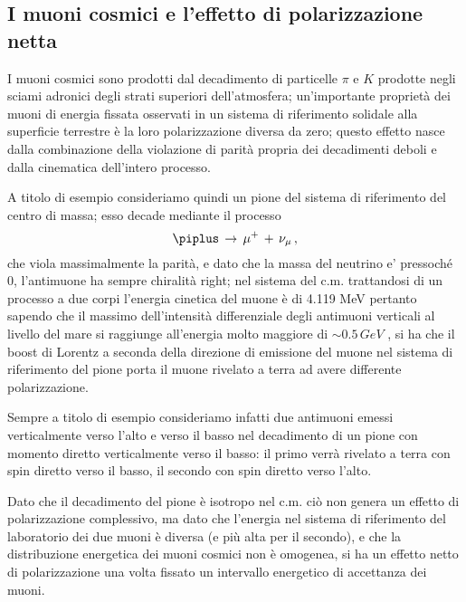 \subsection{I muoni cosmici e l'effetto di polarizzazione netta}
I muoni cosmici sono prodotti dal decadimento di particelle $\pi$ e $K$ prodotte negli sciami adronici degli strati superiori dell'atmosfera; un'importante proprietà dei muoni di energia fissata osservati in un sistema di riferimento solidale alla superficie terrestre è la loro polarizzazione diversa da zero; questo effetto nasce dalla combinazione della violazione di parità propria dei decadimenti deboli e dalla cinematica dell'intero processo. \par
A titolo di esempio consideriamo quindi un pione del sistema di riferimento del centro di massa; esso decade mediante il processo
\begin{equation}
	\piplus \, \to \, \mu^+ \, + \, \nu_{\mu} \, ,
	\label{eq:pi_decay}
\end{equation}
che viola massimalmente la parità, e dato che la massa del neutrino e' pressoch\'e 0, l'antimuone ha sempre chiralità right; nel sistema del c.m. trattandosi di un processo a due corpi l'energia cinetica del muone è di 4.119 MeV  pertanto sapendo che il massimo dell'intensità differenziale degli antimuoni verticali al livello del mare si raggiunge all'energia molto maggiore di $\sim 0.5 \, GeV$  \cite{bib:AJP-Amsler}, si ha che il boost di Lorentz a seconda della direzione di emissione del muone nel sistema di riferimento del pione porta il muone rivelato a terra ad avere differente polarizzazione. \par
Sempre a titolo di esempio consideriamo infatti due antimuoni emessi verticalmente verso l'alto e verso il basso nel decadimento di un pione con momento diretto verticalmente verso il basso:
il primo verrà rivelato a terra con spin diretto verso il basso, il secondo con spin diretto verso l'alto. \par
Dato che il decadimento del pione è isotropo nel c.m. ciò non genera un effetto di polarizzazione complessivo, ma dato che l'energia nel sistema di riferimento del laboratorio dei due muoni è diversa (e più alta per il secondo), e che la distribuzione energetica dei muoni cosmici non è omogenea, si ha un effetto netto di polarizzazione una volta fissato un intervallo energetico di accettanza dei muoni. \cite{bib:Lipari:1993hd} \par
{} \par
